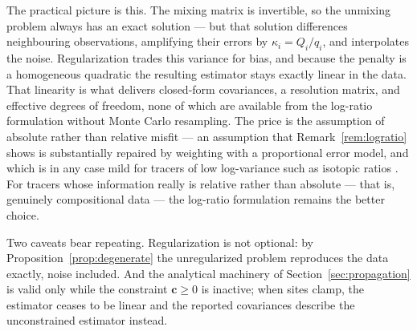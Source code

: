 \documentclass[11pt]{article}
\newcommand{\cvec}{\ensuremath{\mathbf{c}}\xspace}
\theoremstyle{definition}
\begin{document}
\noindent The practical picture is this. The mixing matrix is invertible, so the unmixing
problem always has an exact solution --- but that solution differences neighbouring
observations, amplifying their errors by $\kappa_i = Q_i/q_i$, and interpolates the noise.
Regularization trades this variance for bias, and because the penalty is a homogeneous
quadratic the resulting estimator stays exactly linear in the data. That linearity is what
delivers closed-form covariances, a resolution matrix, and effective degrees of freedom, none
of which are available from the log-ratio formulation without Monte Carlo resampling. The price
is the assumption of absolute rather than relative misfit --- an assumption that
Remark~\ref{rem:logratio} shows is substantially repaired by weighting with a proportional
error model, and which is in any case mild for tracers of low log-variance such as isotopic
ratios \parencite{blondes_practical_2016}. For tracers whose information really is relative
rather than absolute --- that is, genuinely compositional data
\parencite{aitchison_statistical_1986} --- the log-ratio formulation remains the better choice.

Two caveats bear repeating. Regularization is not optional: by
Proposition~\ref{prop:degenerate} the unregularized problem reproduces the data exactly, noise
included. And the analytical machinery of Section~\ref{sec:propagation} is valid only while
the constraint $\cvec \ge 0$ is inactive; when sites clamp, the estimator ceases to be linear
and the reported covariances describe the unconstrained estimator instead.

\printbibliography
\end{document}
